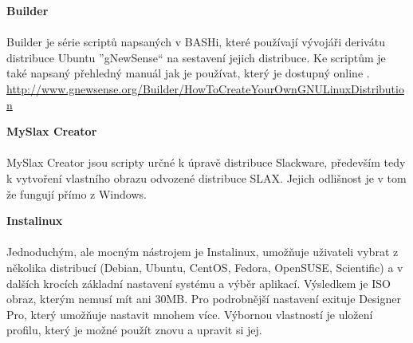\documentclass[a4paper,12pt]{article}
\newcommand{\nadpis}[1]{%
	\vspace{4 mm}
	\textbf{#1}\\
	\vspace{4 mm}
	}
\begin{document}
\nadpis{Builder}\\
Builder je série scriptů napsaných v BASHi, které používají vývojáři derivátu distribuce Ubuntu ''gNewSense`` na sestavení jejich distribuce. Ke scriptům je také napsaný přehledný manuál jak je používat, který je dostupný online \cite{Linux_Build}.\\ \href{http://www.gnewsense.org/Builder/HowToCreateYourOwnGNULinuxDistribution}{http://www.gnewsense.org/Builder/HowToCreateYourOwnGNULinuxDistribution}

\nadpis{MySlax Creator}\\
MySlax Creator jsou scripty určné k úpravě distribuce Slackware, především tedy k vytvoření vlastního obrazu odvozené distribuce SLAX. Jejich odlišnost je v tom že fungují přímo z Windows.


\nadpis{Instalinux}\\ \label{sec:Instalinux}
Jednoduchým, ale mocným nástrojem je Instalinux, umožňuje uživateli vybrat z několika distribucí (Debian, Ubuntu, CentOS, Fedora, OpenSUSE, Scientific) a v dalších krocích základní nastavení systému a výběr aplikací. Výsledkem je ISO obraz, kterým nemusí mít ani 30MB. Pro podrobnější nastavení exituje Designer Pro, který umožňuje nastavit mnohem více. Výbornou vlastností je uložení profilu, který je možné použít znovu a upravit si jej.\\
\end{document}
